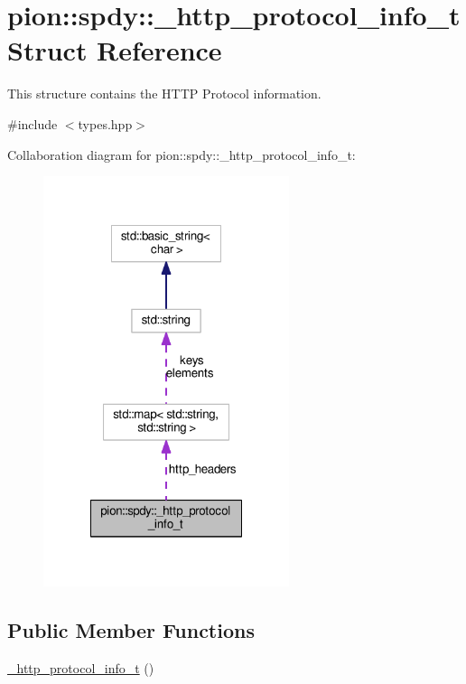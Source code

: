 \hypertarget{structpion_1_1spdy_1_1__http__protocol__info__t}{\section{pion\-:\-:spdy\-:\-:\-\_\-http\-\_\-protocol\-\_\-info\-\_\-t Struct Reference}
\label{structpion_1_1spdy_1_1__http__protocol__info__t}
}


This structure contains the H\-T\-T\-P Protocol information.  




{\ttfamily \#include $<$types.\-hpp$>$}



Collaboration diagram for pion\-:\-:spdy\-:\-:\-\_\-http\-\_\-protocol\-\_\-info\-\_\-t\-:
\nopagebreak
\begin{figure}[H]
\begin{center}
\leavevmode
\includegraphics[width=204pt]{structpion_1_1spdy_1_1__http__protocol__info__t__coll__graph}
\end{center}
\end{figure}
\subsection*{Public Member Functions}
\begin{DoxyCompactItemize}
\item 
\hyperlink{structpion_1_1spdy_1_1__http__protocol__info__t_a702945e6cdc007b0788a73dcf014108f}{\-\_\-http\-\_\-protocol\-\_\-info\-\_\-t} ()
\end{DoxyCompactItemize}
